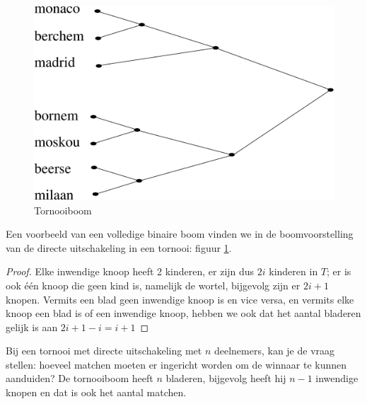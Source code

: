 \begin{figure}[ht]
\begin{center}
\includegraphics[width=0.5\linewidth,keepaspectratio]{tornooi1}
\end{center}
\caption{Tornooiboom \label{tornooi1}}
\end{figure}


Een voorbeeld van een volledige binaire boom vinden we in de
boomvoorstelling van de directe uitschakeling in een tornooi: figuur
\ref{tornooi1}.

\begin{proof} Elke inwendige knoop heeft 2 kinderen, er zijn dus
$2i$ kinderen in $T$; er is ook \'{e}\'{e}n knoop die geen kind is,
namelijk de wortel, bijgevolg zijn er $2i+1$ knopen. Vermits een blad
geen inwendige knoop is en vice versa, en vermits elke knoop een blad
is of een inwendige knoop, hebben we ook dat het aantal bladeren
gelijk is aan $2i+1 - i = i+1$
\end{proof}



Bij een tornooi met directe uitschakeling met $n$ deelnemers, kan je de
vraag stellen: hoeveel matchen moeten er ingericht worden om de
winnaar te kunnen aanduiden? De tornooiboom heeft $n$ bladeren,
bijgevolg heeft hij $n-1$ inwendige knopen en dat is ook het aantal
matchen.

